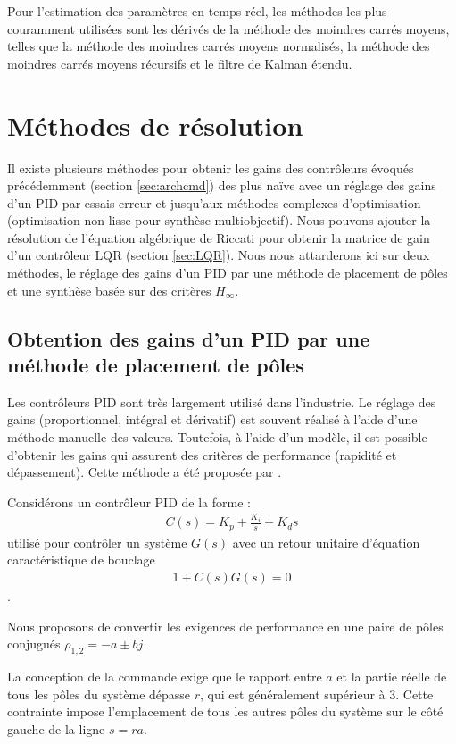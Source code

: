 Pour l'estimation des paramètres en temps réel, les méthodes les plus couramment utilisées sont les dérivés de la méthode des moindres carrés moyens, telles que la méthode des moindres carrés moyens normalisés, la méthode des moindres carrés moyens récursifs et le filtre de Kalman étendu. 

\section{Méthodes de résolution}
\label{sec:methodo}
{\color{blue}
    Il existe plusieurs méthodes pour obtenir les gains des contrôleurs évoqués précédemment (section \ref{sec:archcmd}) des plus naïve avec un réglage des gains d'un PID par essais erreur et jusqu'aux méthodes complexes d'optimisation (optimisation non lisse pour synthèse multiobjectif). Nous pouvons ajouter la résolution de l'équation algébrique de Riccati pour obtenir la matrice de gain d'un contrôleur LQR (section \ref{sec:LQR}). Nous nous attarderons ici sur deux méthodes, le réglage des gains d'un PID par une méthode de placement de pôles et une synthèse basée sur des critères $H_{\infty}$.


\subsection*{Obtention des gains d'un PID par une méthode de placement de pôles \cite{WANG2008PID}}
Les contrôleurs PID sont très largement utilisé dans l'industrie. Le réglage des gains (proportionnel, intégral et dérivatif) est souvent réalisé à l'aide d'une méthode manuelle des valeurs. Toutefois, à l'aide d'un modèle, il est possible d'obtenir les gains qui assurent des critères de performance (rapidité et dépassement). Cette méthode a été proposée par \cite{WANG2008PID}.

Considérons un contrôleur PID de la forme :
\begin{align}
    C(s) = K_{p} +  \frac{K_{i}}{s} + K_{d} s
\end{align}
utilisé pour contrôler un système $G(s)$ avec un retour unitaire d'équation caractéristique de bouclage 
\begin{align}
    \label{eq:bouclePID}
    1+ C(s)G(s) = 0
\end{align}.

Nous proposons de convertir les exigences de performance en une paire de pôles conjugués $\rho_{1,2} = -a \pm bj$.

La conception de la commande exige que le rapport entre $a$ et la partie réelle de tous les pôles du système dépasse $r$, qui est généralement supérieur à 3. Cette contrainte impose l'emplacement de tous les autres pôles du système sur le côté gauche de la ligne $s = ra$.

}
